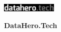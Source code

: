 \documentclass[\main/boa.tex]{subfiles}
\begin{document}
	
	\begin{minipage}[t]{0.915\textwidth}
		\center     
		\includegraphics[width=100px]{img/logos.bw/logo_dh.png} 
	\end{minipage}
	\begin{center}
	\Large \textbf {DataHero.Tech}
	\end{center}
	
	\vskip 0.3cm
	\normalsize 

	\vskip 1.5cm
\end{document}
